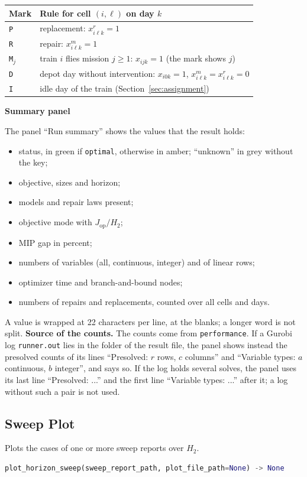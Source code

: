 \documentclass[11pt,a4paper]{article}
\makeatletter
\theoremstyle{plain}
\theoremstyle{definition}
\newcommand{\blockhead}[1]{\par\noindent\textbf{#1}\par\nobreak}
\renewcommand{\_}{\textunderscore\allowbreak{}}
\providecommand{\rejrow}[2]{{\raggedright #1\par} & {\raggedright #2\par} \\}
\providecommand{\tabstart}[2]{\begingroup\small\begin{longtable}{@{}#1@{}}\toprule #2 \\ \midrule \endhead}
\providecommand{\tabend}{\bottomrule\end{longtable}\endgroup}
\makeatother
\begin{document}
\tabstart{p{1.6cm}p{13.4cm}}{Mark & Rule for cell $(i,\ell)$ on day $k$}
\rejrow{\texttt{P}}{replacement: $x^r_{i\ell k} = 1$}
\rejrow{\texttt{R}}{repair: $x^m_{i\ell k} = 1$}
\rejrow{\texttt{M}$_j$}{train $i$ flies mission $j \geq 1$: $x_{ijk} = 1$ (the mark shows $j$)}
\rejrow{\texttt{D}}{depot day without intervention: $x_{i0k} = 1$, $x^m_{i\ell k} = x^r_{i\ell k} = 0$}
\rejrow{\texttt{I}}{idle day of the train (Section~\ref{sec:assignment})}
\tabend

\blockhead{Summary panel}
The panel ``Run summary'' shows the values that the result holds:
\begin{itemize}[nosep]
  \item status, in green if \texttt{optimal}, otherwise in amber; ``unknown'' in grey without the key;
  \item objective, sizes and horizon;
  \item models and repair laws present;
  \item objective mode with $J_{\mathrm{op}}/H_2$;
  \item MIP gap in percent;
  \item numbers of variables (all, continuous, integer) and of linear rows;
  \item optimizer time and branch-and-bound nodes;
  \item numbers of repairs and replacements, counted over all cells and days.
\end{itemize}
A value is wrapped at 22 characters per line, at the blanks; a longer word is not split.
\textbf{Source of the counts.} The counts come from \texttt{performance}. If a Gurobi log \texttt{runner.out} lies in the folder of the result file, the panel shows instead the presolved counts of its lines ``Presolved: $r$ rows, $c$ columns'' and ``Variable types: $a$ continuous, $b$ integer'', and says so. If the log holds several solves, the panel uses its last line ``Presolved: ...'' and the first line ``Variable types: ...'' after it; a log without such a pair is not used.

\subsection{Sweep Plot}

Plots the cases of one or more sweep reports over $H_2$.

\begin{lstlisting}[language=Python]
plot_horizon_sweep(sweep_report_path, plot_file_path=None) -> None
\end{lstlisting}
\end{document}
